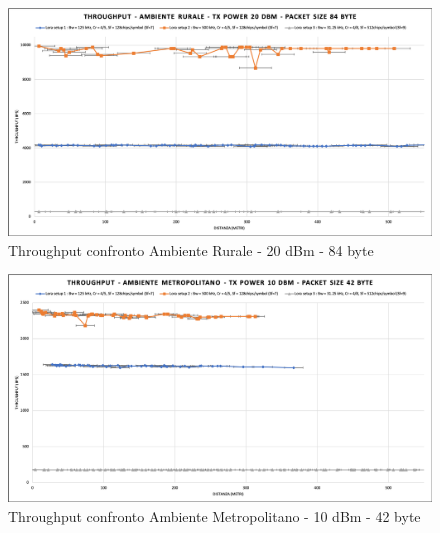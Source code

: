 \documentclass[12pt,a4paper,openright,twoside]{report}
\begin{document}
\begin{figure}[h]                      
\begin{center} 
\includegraphics[width=\textwidth]{THROUGHPUT_confronto_AR_20dBm_84byte.png}
\caption[Throughput confronto Ambiente Rurale - 20 dBm - 84 byte]{Throughput confronto Ambiente Rurale - 20 dBm - 84 byte}\label{fig:prima}
\end{center}
\end{figure}

\begin{figure}[h]                      
\begin{center} 
\includegraphics[width=\textwidth]{THROUGHPUT_confronto_AM_10dBm_42byte.png}
\caption[Throughput confronto Ambiente Metropolitano - 10 dBm - 42 byte]{Throughput confronto Ambiente Metropolitano - 10 dBm - 42 byte}\label{fig:prima}
\end{center}
\end{figure}
\end{document}
